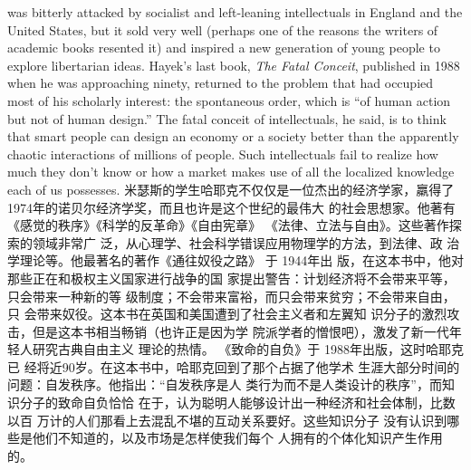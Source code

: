 \begin{paracol}{2}
was bitterly attacked by socialist and left-leaning intellectuals
in England and the United States, but it sold very well (perhaps
one of the reasons the writers of academic books resented it)
and inspired a new generation of young people to explore libertarian ideas. Hayek's last book, \textit{The Fatal Conceit}, published in
1988 when he was approaching ninety, returned to the problem
that had occupied most of his scholarly interest: the spontaneous order, which is ``of human action but not of human design.'' The fatal conceit of intellectuals, he said, is to think that
smart people can design an economy or a society better than the
apparently chaotic interactions of millions of people. Such intellectuals fail to realize how much they don't know or how a market makes use of all the localized knowledge each of us
possesses.
\switchcolumn
米瑟斯的学生哈耶克不仅仅是一位杰出的经济学家，羸得了 1974年的诺贝尔经济学奖，而且也许是这个世纪的最伟大
的社会思想家。他著有《感觉的秩序》《科学的反革命》《自由宪章》 《法律、立法与自由》。这些著作探索的领域非常广
泛，从心理学、社会科学错误应用物理学的方法，到法律、政
治学理论等。他最著名的著作《通往奴役之路》 于 1944年出
版，在这本书中，他对那些正在和极权主义国家进行战争的国
家提出警告：计划经济将不会带来平等，只会带来一种新的等
级制度；不会带来富裕，而只会带来贫穷；不会带来自由，只
会带来奴役。这本书在英国和美国遭到了社会主义者和左翼知
识分子的激烈攻击，但是这本书相当畅销（也许正是因为学
院派学者的憎恨吧），激发了新一代年轻人研究古典自由主义
理论的热情。 《致命的自负》于 1988年出版，这时哈耶克已
经将近90岁。在这本书中，哈耶克回到了那个占据了他学术
生涯大部分时间的问题：自发秩序。他指出：“自发秩序是人
类行为而不是人类设计的秩序”，而知识分子的致命自负恰恰
在于，认为聪明人能够设计出一种经济和社会体制，比数以百
万计的人们那看上去混乱不堪的互动关系要好。这些知识分子
没有认识到哪些是他们不知道的，以及市场是怎样使我们每个
人拥有的个体化知识产生作用的。


\end{paracol}
